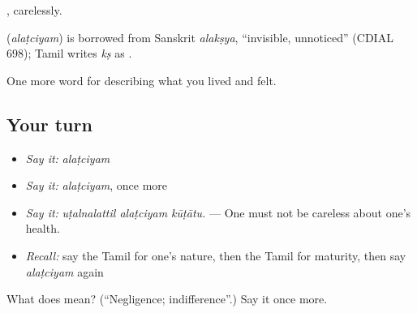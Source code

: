 , carelessly.

\begin{cousinweb}
\textbf{} (\emph{alaṭciyam}) is borrowed from Sanskrit \emph{alakṣya}, \textquotedblleft{}invisible, unnoticed\textquotedblright{} (CDIAL 698); Tamil writes \emph{kṣ} as .
\end{cousinweb}

\begin{grammarlens}[title={What you've built}]
One more word for describing what you lived and felt.
\end{grammarlens}

\subsection*{Your turn}
\begin{itemize}
\raggedright
  \item \emph{Say it:} \emph{alaṭciyam}
  \item \emph{Say it:} \emph{alaṭciyam}, once more
  \item \emph{Say it:} \emph{uṭalnalattil alaṭciyam kūṭātu.} — One must not be careless about one’s health.
  \item \emph{Recall:} say the Tamil for one’s nature, then the Tamil for maturity, then say \emph{alaṭciyam} again
\end{itemize}

\begin{tcolorbox}[breakable,colback=teal!4,colframe=teal!35!black,title={Before you move on}]
What does  mean? (\textquotedblleft{}Negligence; indifference\textquotedblright{}.) Say it once more.
\end{tcolorbox}
